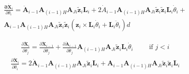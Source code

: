 \documentclass{article}
\begin{document}
\begin{eqnarray}
\frac{\mathbf{\partial \ddot X}_i}{\partial \theta_i}=
\ddot{\mathbf A}_{i-1}\mathbf{A}_{(i-1)H}\mathbf{A}_{Ji}\tilde{\mathbf z}_i\mathbf{L}_i +
2\dot{A}_{i-1}\mathbf{A}_{(i-1)H}\mathbf{A}_{Ji}\tilde{\mathbf z}_i\tilde{\mathbf z}_i\mathbf{L}_i\dot{\theta}_i+
\nonumber\\
\mathbf{A}_{i-1}\mathbf{A}_{(i-1)H}\mathbf{A}_{Ji}\tilde{\mathbf z}_i\tilde{\mathbf z}_i(\mathbf{z}_i\times\mathbf{L}_i\dot{\theta}_i+\mathbf{L}_i\ddot{\theta}_i)
d\end{eqnarray}

\begin{eqnarray}
\frac{\partial \ddot{\mathbf X}_i}{\partial \dot{\theta}_j}=
\frac{\partial \ddot{\mathbf X}_{i-1}}{\partial \dot{\theta}_j}+\frac{\partial \ddot{\mathbf A}_{i-1}}{\partial \dot{\theta}_j}
\mathbf{A}_{(i-1)H}\mathbf{A}_{Ji}\tilde{\mathbf z}_i\mathbf{L}_i\dot{\theta}_i
	\qquad \textrm{  if  } j < i
\end{eqnarray}
\begin{eqnarray}
\frac{\partial \ddot{\mathbf X}_i}{\partial \dot{\theta}_i}=
2\dot{\mathbf A}_{i-1}\mathbf{A}_{(i-1)H}\mathbf{A}_{Ji}\tilde{\mathbf z}_i\mathbf{L}_i+\mathbf{A}_{i-1}\mathbf{A}_{(i-1)H}\mathbf{A}_{Ji}\tilde{\mathbf z}_i\tilde{\mathbf z}_i\mathbf{L}_i
\end{eqnarray}
\end{document}

